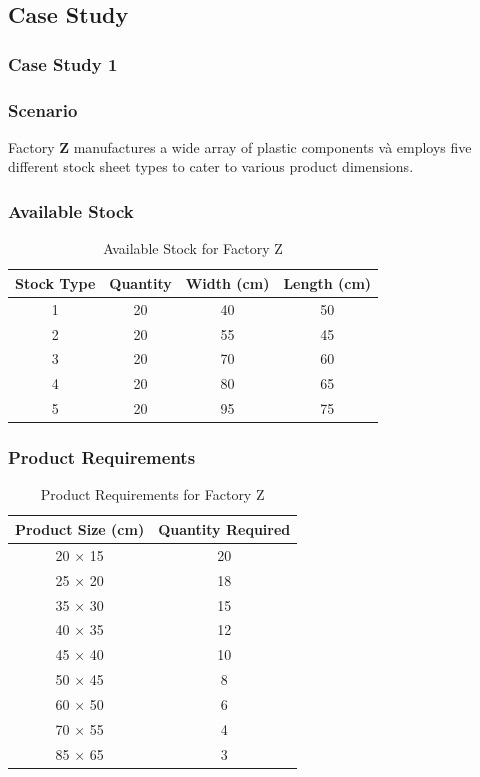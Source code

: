 \documentclass[a4paper]{article}
\begin{document}
\subsection{Case Study}

\subsubsection{Case Study 1}

\subsubsection*{Scenario}
Factory \textbf{Z} manufactures a wide array of plastic components và employs five different stock sheet types to cater to various product dimensions.

\subsubsection*{Available Stock}
\begin{table}[H]
    \centering
    \caption{Available Stock for Factory Z}
    \begin{tabular}{|c|c|c|c|}
        \hline
        \textbf{Stock Type} & \textbf{Quantity} & \textbf{Width (cm)} & \textbf{Length (cm)} \\ \hline
        1 & 20 & 40 & 50 \\ \hline
        2 & 20 & 55 & 45 \\ \hline
        3 & 20 & 70 & 60 \\ \hline
        4 & 20 & 80 & 65 \\ \hline
        5 & 20 & 95 & 75 \\ \hline
    \end{tabular}
\end{table}

\subsubsection*{Product Requirements}
\begin{table}[H]
    \centering
    \caption{Product Requirements for Factory Z}
    \begin{tabular}{|c|c|}
        \hline
        \textbf{Product Size (cm)} & \textbf{Quantity Required} \\ \hline
        20 × 15 & 20 \\ \hline
        25 × 20 & 18 \\ \hline
        35 × 30 & 15 \\ \hline
        40 × 35 & 12 \\ \hline
        45 × 40 & 10 \\ \hline
        50 × 45 & 8 \\ \hline
        60 × 50 & 6 \\ \hline
        70 × 55 & 4 \\ \hline
        85 × 65 & 3 \\ \hline
    \end{tabular}
\end{table}
\end{document}
